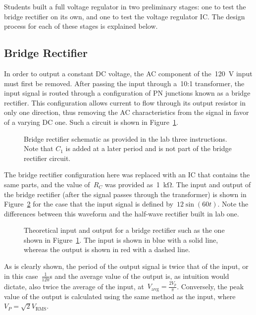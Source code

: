 Students built a full voltage regulator in two preliminary stages: one to test
the bridge rectifier on its own, and one to test the voltage regulator IC.  The
design process for each of these stages is explained below.

\subsection{Bridge Rectifier}
In order to output a constant DC voltage, the AC component of
the~\SI{120}{\volt} input must first be removed.  After passing the input
through a~10:1 transformer, the input signal is routed through a configuration
of PN junctions known as a bridge rectifier.  This configuration allows current
to flow through its output resistor in only one direction, thus removing the AC
characteristics from the signal in favor of a varying DC one.  Such a circuit
is shown in Figure~\ref{fig:bridgeSchem}.
%
\begin{figure}[H]
	\centering
	
	\parbox{.6\textwidth}{
	\caption[Schematic --- Bridge Rectifier]{Bridge rectifier schematic as
	provided in the lab three instructions.  Note that $C_1$ is added at a
	later period and is not part of the bridge rectifier circuit.}
	\label{fig:bridgeSchem}}
\end{figure}
%
The bridge rectifier configuration here was replaced with an IC that contains
the same parts, and the value of~$R_C$ was provided as~\SI{1}{\kilo\ohm}.  The
input and output of the bridge rectifier (after the signal passes through the
transformer) is shown in Figure~\ref{fig:bridgeRectOut} for the case that the
input signal is defined by~$12 \sin(60t)$.  Note the differences between this
waveform and the half-wave rectifier built in lab one.
%
\begin{figure}[H]
	\centering
	
	\parbox{.6\textwidth}{
	\caption[Plot --- Unfiltered Bridge Rectifier Output]{Theoretical input and
	output for a bridge rectifier such as the one shown in
	Figure~\ref{fig:bridgeSchem}.  The input is shown in blue with a solid
	line, whereas the output is shown in red with a dashed line.}
	\label{fig:bridgeRectOut}
	}
\end{figure}
%
As is clearly shown, the period of the output signal is twice that of the
input, or in this case~$\frac{1}{120}$\si{\second} and the average value of the
output is, as intuition would dictate, also twice the average of the input,
at~$V_\text{avg} = \frac{2 V_p}{\pi}$.  Conversely, the peak value of the
output is calculated using the same method as the input,
where~$V_P=\sqrt{2}V_\mathrm{RMS}$.

